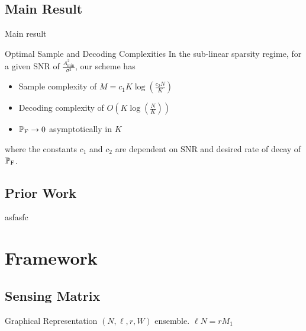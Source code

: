 \documentclass[10pt]{beamer}
\begin{document}
\subsection{Main Result}
\begin{frame}{Main result}

\begin{block}{Optimal Sample and Decoding Complexities}
In the sub-linear sparsity regime, for a given SNR of $\frac{A^{2}_{\text{min}}}{\sigma^{2}}$, our scheme has 
\begin{itemize}
\item Sample complexity of $M=c_1 K\log (\frac{c_2 N}{K})$
\item Decoding complexity of $O\left(K\log(\frac{N}{K})\right)$ 
\item $\mathbb{P}_{\text{F}}\rightarrow 0$ asymptotically in $K$
\end{itemize} 
where the constants $c_{1}$ and $c_{2}$ are dependent on SNR and desired rate of decay of $\mathbb{P}_{\text{F}}$.
\end{block}
\end{frame}

\subsection{Prior Work}
\begin{frame}
asfasfc
\end{frame}

\section{Framework}
\subsection{Sensing Matrix}
\begin{frame}{Graphical Representation}
$(N,\ell,r,W)$ ensemble. $\ell N=rM_1$
\begin{figure}
\scalebox{1.3}{}
\end{figure}
\end{frame}
\end{document}
